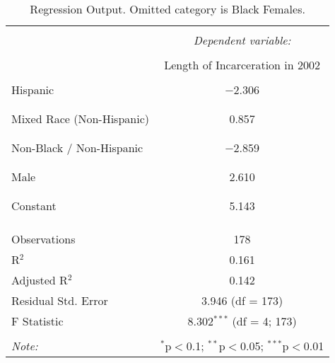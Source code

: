 
\begin{table}[!htbp] \centering 
  \caption{Regression Output. Omitted category is Black Females.} 
  \label{tab:regression} 
\begin{tabular}{@{\extracolsep{5pt}}lc} 
\\[-1.8ex]\hline 
\hline \\[-1.8ex] 
 & \multicolumn{1}{c}{\textit{Dependent variable:}} \\ 
\cline{2-2} 
\\[-1.8ex] & Length of Incarceration in 2002 \\ 
\hline \\[-1.8ex] 
 Hispanic & $-$2.306 \\ 
  &  \\ 
  & \\ 
 Mixed Race (Non-Hispanic) & 0.857 \\ 
  &  \\ 
  & \\ 
 Non-Black / Non-Hispanic & $-$2.859 \\ 
  &  \\ 
  & \\ 
 Male & 2.610 \\ 
  &  \\ 
  & \\ 
 Constant & 5.143 \\ 
  &  \\ 
  & \\ 
\hline \\[-1.8ex] 
Observations & 178 \\ 
R$^{2}$ & 0.161 \\ 
Adjusted R$^{2}$ & 0.142 \\ 
Residual Std. Error & 3.946 (df = 173) \\ 
F Statistic & 8.302$^{***}$ (df = 4; 173) \\ 
\hline 
\hline \\[-1.8ex] 
\textit{Note:}  & \multicolumn{1}{r}{$^{*}$p$<$0.1; $^{**}$p$<$0.05; $^{***}$p$<$0.01} \\ 
\end{tabular} 
\end{table} 
